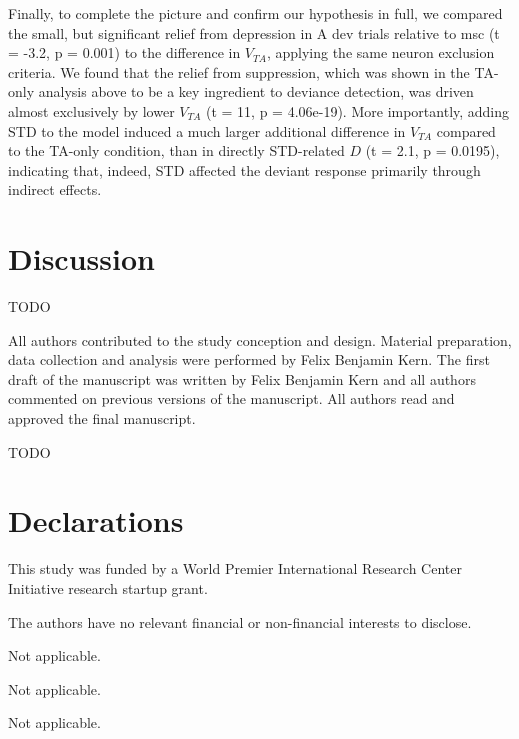 \documentclass[pdflatex,referee,iicol,sn-basic]{sn-jnl}
\theoremstyle{thmstyleone}%
\theoremstyle{thmstyletwo}%
\theoremstyle{thmstylethree}%
\begin{document}
Finally, to complete the picture and confirm our hypothesis in full, we compared the small, but significant relief from depression in A dev trials relative to msc (t = -3.2, p = 0.001) to the difference in $V_{TA}$, applying the same neuron exclusion criteria. We found that the relief from suppression, which was shown in the TA-only analysis above to be a key ingredient to deviance detection, was driven almost exclusively by lower $V_{TA}$ (t = 11, p = 4.06e-19). More importantly, adding STD to the model induced a much larger additional difference in $V_{TA}$ compared to the TA-only condition, than in directly STD-related $D$ (t = 2.1, p = 0.0195), indicating that, indeed, STD affected the deviant response primarily through indirect effects.

\section{Discussion}\label{sec-discussion}






\backmatter

TODO

All authors contributed to the study conception and design. Material preparation, data collection and analysis were performed by Felix Benjamin Kern. The first draft of the manuscript was written by Felix Benjamin Kern and all authors commented on previous versions of the manuscript. All authors read and approved the final manuscript.

TODO

\section*{Declarations}

This study was funded by a World Premier International Research Center Initiative research startup grant.

The authors have no relevant financial or non-financial interests to disclose.

Not applicable.

Not applicable.

Not applicable.

\end{document}
